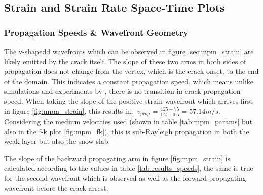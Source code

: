 

\subsection{Strain and Strain Rate Space-Time Plots}


\subsubsection{Propagation Speeds \& Wavefront Geometry}

The v-shapedd wavefronts which can be observed in figure \ref{sec:mpm_strain} are likely emitted by the crack itself. The slope of these two arms in both sides of propagation does not change from the vertex, which is the crack onset, to the end of the domain. This indicates a constant propagation speed, which means unlike simulations and experiments by \cite{sironTheoreticalFrameworkDynamic2023,bergfeldSignaturesSubRayleighSupershear2025}, there is no transition in crack propagation speed. When taking the slope of the positive strain wavefront which arrives first in figure \ref{fig:mpm_strain}, this results in: $\ v_{prop} = \frac{125-75}{1.2-0.5} = 57.14 m/s$. Considering the medium velocities used (shown in table \ref{tab:mpm_params} but also in the f-k plot \ref{fig:mpm_fk}), this is sub-Rayleigh propagation in both the weak layer but also the snow slab. \par

The slope of the backward propagating arm in figure \ref{fig:mpm_strain} is calculated according to the values in table \ref{tab:results_speeds}, the same is true for the second wavefront which is observed as well as the forward-propagating wavefront before the crack arrest. 

